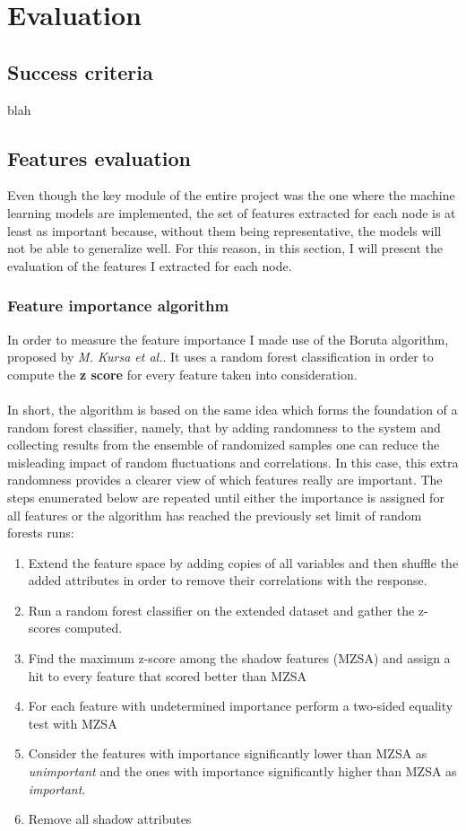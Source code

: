 
	\chapter{Evaluation}
	\section{Success criteria} \label{Section: eval/success-criteria}
		blah
	\section{Features evaluation} \label{Section: eval/features}
		Even though the key module of the entire project was the one where the machine learning models are implemented, the set of features extracted for each node is at least as important because, without them being representative, the models will not be able to generalize well. For this reason, in this section, I will present the evaluation of the features I extracted for each node.
		
	\subsection{Feature importance algorithm} \label{Section: eval/features/alg}
		In order to measure the feature importance I made use of the Boruta algorithm, proposed by \textit{M. Kursa et al.}\cite{JSSv036i11}. It uses a random forest classification in order to compute the \textbf{z score} for every feature taken into consideration. 
		\\ \\
		In short, the algorithm is based on the same idea which forms the foundation of a random forest classifier, namely, that by adding randomness to the system and collecting results from the ensemble of randomized samples one can reduce the misleading impact of random fluctuations and correlations. In this case, this extra randomness provides a clearer view of which features really are important. The steps enumerated below are repeated until either the importance is assigned for all features or the algorithm has reached the previously set limit of random forests runs:
		\begin{enumerate}
			\item Extend the feature space by adding copies of all variables and then shuffle the added attributes in order to remove their correlations with the response.
			\item Run a random forest classifier on the extended dataset and gather the z-scores computed.
			\item Find the maximum z-score among the shadow features (MZSA) and assign a hit to every feature that scored better than MZSA
			\item For each feature with undetermined importance perform a two-sided equality test with MZSA
			\item Consider the features with importance significantly lower than MZSA as \textit{unimportant} and the ones with importance significantly higher than MZSA as \textit{important}.
			\item Remove all shadow attributes
		\end{enumerate}
